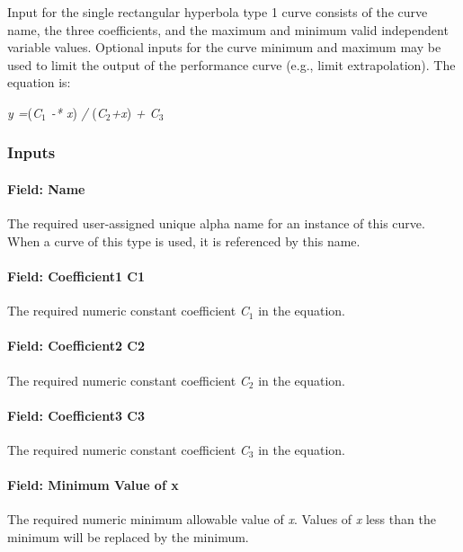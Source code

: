 Input for the single rectangular hyperbola type 1 curve consists of the curve name, the three coefficients, and the maximum and minimum valid independent variable values. Optional inputs for the curve minimum and maximum may be used to limit the output of the performance curve (e.g., limit extrapolation). The equation is:

\emph{y =}(\emph{C\(_{1}\) -* x}) \emph{/} (\emph{C\(_{2}\)+x}) \emph{+ C\(_{3}\)}

\subsubsection{Inputs}\label{inputs-15-008}

\paragraph{Field: Name}\label{field-name-15-005}

The required user-assigned unique alpha name for an instance of this curve. When a curve of this type is used, it is referenced by this name.

\paragraph{Field: Coefficient1 C1}\label{field-coefficient1-c1-2}

The required numeric constant coefficient \emph{C\(_{1}\)} in the equation.

\paragraph{Field: Coefficient2 C2}\label{field-coefficient2-c2-2}

The required numeric constant coefficient \emph{C\(_{2}\)} in the equation.

\paragraph{Field: Coefficient3 C3}\label{field-coefficient3-c3-2}

The required numeric constant coefficient \emph{C\(_{3}\)} in the equation.

\paragraph{Field: Minimum Value of x}\label{field-minimum-value-of-x-14}

The required numeric minimum allowable value of \emph{x}. Values of \emph{x} less than the minimum will be replaced by the minimum.

